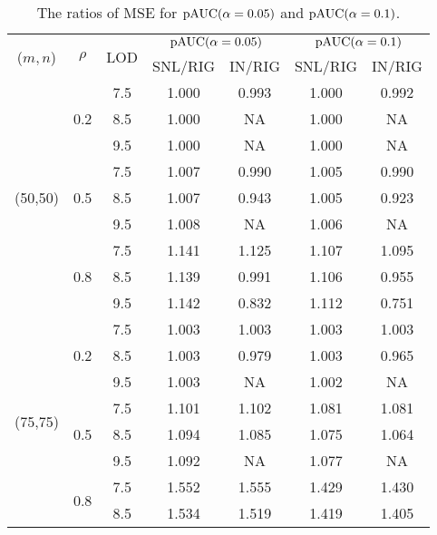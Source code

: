 \documentclass[a4,11pt,epsf, amssymb]{article}
\begin{document}
\begin{table}[htbp]
  \centering
  \caption{The ratios of MSE for $\hbox {pAUC}(\alpha = 0.05)$ and $\hbox {pAUC}(\alpha = 0.1)$.}
    \begin{tabular}{c|cccccc}
    \hline
    \multirow{2}[2]{*}{($m,n$)} & \multirow{2}[2]{*}{$\rho$} & \multirow{2}[2]{*}{LOD} & \multicolumn{2}{c}{$\hbox {pAUC}(\alpha = 0.05)$} & \multicolumn{2}{c}{$\hbox {pAUC}(\alpha = 0.1)$} \\
          &       &       & SNL/RIG & IN/RIG & SNL/RIG & IN/RIG \\
    \hline
    \multirow{9}[6]{*}{(50,50)} & \multirow{3}[2]{*}{0.2} & 7.5   & 1.000  & 0.993  & 1.000  & 0.992  \\
          &       & 8.5   & 1.000  & NA    & 1.000  & NA \\
          &       & 9.5   & 1.000  & NA    & 1.000  & NA \\
\cline{2-7}          & \multirow{3}[2]{*}{0.5} & 7.5   & 1.007  & 0.990  & 1.005  & 0.990  \\
          &       & 8.5   & 1.007  & 0.943  & 1.005  & 0.923  \\
          &       & 9.5   & 1.008  & NA    & 1.006  & NA \\
\cline{2-7}          & \multirow{3}[2]{*}{0.8} & 7.5   & 1.141  & 1.125  & 1.107  & 1.095  \\
          &       & 8.5   & 1.139  & 0.991  & 1.106  & 0.955  \\
          &       & 9.5   & 1.142  & 0.832  & 1.112  & 0.751  \\
    \hline
    \multirow{9}[6]{*}{(75,75)} & \multirow{3}[2]{*}{0.2} & 7.5   & 1.003  & 1.003  & 1.003  & 1.003  \\
          &       & 8.5   & 1.003  & 0.979  & 1.003  & 0.965  \\
          &       & 9.5   & 1.003  & NA    & 1.002  & NA \\
\cline{2-7}          & \multirow{3}[2]{*}{0.5} & 7.5   & 1.101  & 1.102  & 1.081  & 1.081  \\
          &       & 8.5   & 1.094  & 1.085  & 1.075  & 1.064  \\
          &       & 9.5   & 1.092  & NA    & 1.077  & NA \\
\cline{2-7}          & \multirow{3}[2]{*}{0.8} & 7.5   & 1.552  & 1.555  & 1.429  & 1.430  \\
          &       & 8.5   & 1.534  & 1.519  & 1.419  & 1.405  \\

\end{tabular}
\end{table}
\end{document}
